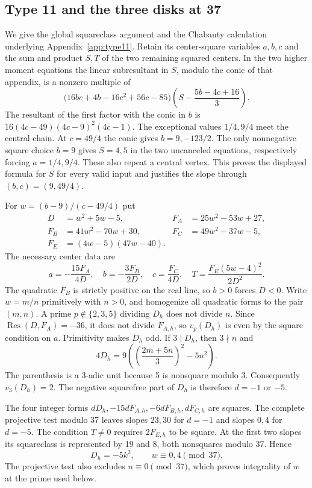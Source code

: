 \subsection{Type 11 and the three disks at 37}\label{app:type11-details}

We give the global squareclass argument and the Chabauty calculation
underlying Appendix~\ref{app:type11}. Retain its center-square variables
$a,b,c$ and the sum and product $S,T$ of the two remaining squared
centers. In the two higher moment equations the linear subresultant
in $S$, modulo the conic of that appendix, is a nonzero multiple of
\[
 \bigl(16bc+4b-16c^2+56c-85\bigr)
                 \left(S-\frac{5b-4c+16}{3}\right).
\]
The resultant of the first factor with the conic in $b$ is
$16(4c-49)(4c-9)^2(4c-1)$. The exceptional values $1/4,9/4$
meet the central chain. At $c=49/4$ the conic gives $b=9,-123/2$.
The only nonnegative square choice $b=9$ gives $S=4,5$ in the two
uncanceled equations, respectively forcing $a=1/4,9/4$. These also
repeat a central vertex. This proves the displayed formula for $S$
for every valid input and justifies the slope through $(b,c)=(9,49/4)$.

For $w=(b-9)/(c-49/4)$ put
\[
\begin{aligned}
 D&=w^2+5w-5,& F_A&=25w^2-53w+27,\\
 F_B&=41w^2-70w+30,&F_C&=49w^2-37w-5,\\
 F_E&=(4w-5)(47w-40).
\end{aligned}
\]
The necessary center data are
\begin{equation}\label{eq:md11-param}
 a=-\frac{15F_A}{4D},\quad b=-\frac{3F_B}{2D},\quad
 c=\frac{F_C}{4D},\quad T=\frac{F_E(5w-4)^2}{2D^2}.
\end{equation}
The quadratic $F_B$ is strictly positive on the real line, so $b>0$
forces $D<0$. Write $w=m/n$ primitively with $n>0$, and homogenize
all quadratic forms to the pair $(m,n)$. A prime $p\notin\{2,3,5\}$
dividing $D_h$ does not divide $n$. Since
$\operatorname{Res}(D,F_A)=-36$, it does not divide $F_{A,h}$,
so $v_p(D_h)$ is even by the square condition on $a$. Primitivity
makes $D_h$ odd. If $3\mid D_h$, then $3\nmid n$ and
\[
 4D_h=9\left(\left(\frac{2m+5n}{3}\right)^2-5n^2\right).
\]
The parenthesis is a 3-adic unit because 5 is nonsquare modulo 3.
Consequently $v_3(D_h)=2$. The negative squarefree part of $D_h$
is therefore $d=-1$ or $-5$.

The four integer forms
$dD_h,-15dF_{A,h},-6dF_{B,h},dF_{C,h}$ are squares.
The complete projective test modulo 37 leaves slopes $23,30$ for
$d=-1$ and slopes $0,4$ for $d=-5$. The condition $T\ne0$
requires $2F_{E,h}$ to be square. At the first two slopes its squareclass
is represented by 19 and 8, both nonsquares modulo 37. Hence
\begin{equation}\label{eq:md11-class}
 D_h=-5k^2,\qquad w\equiv0,4\pmod{37}.
\end{equation}
The projective test also excludes $n\equiv0\pmod{37}$, which proves
integrality of $w$ at the prime used below.

